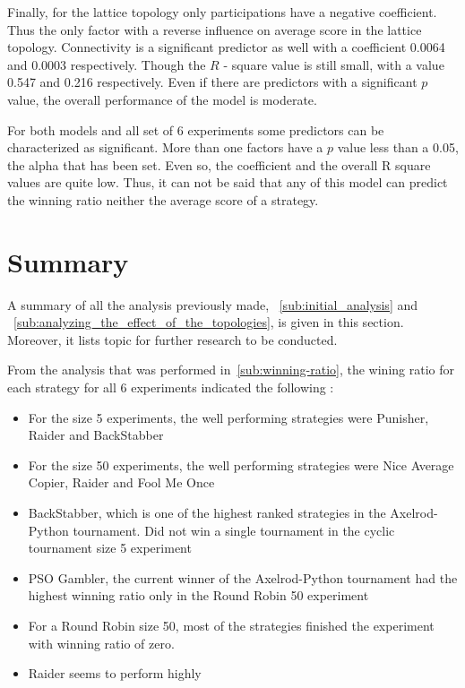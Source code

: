Finally, for the lattice topology only participations have a negative coefficient.
Thus the only factor with a reverse influence on average score in the lattice topology.
Connectivity is a significant predictor as well with a coefficient 0.0064 and
0.0003 respectively. Though the \(R\) - square value is still  small,
with a value 0.547 and 0.216 respectively.
Even if there are predictors with a significant \(p\) value, the overall
performance of the model is moderate.

For both models and all set of 6 experiments some predictors can be characterized
as significant. More than one factors have a \(p\) value less than a 0.05, the alpha
that has been set. Even so, the coefficient and the overall R square values are
quite low. Thus, it can not be said that any of this model can predict the
winning ratio neither the average score of a strategy.

\section{Summary}
\label{sub:summary}

A summary of all the analysis previously made, ~\ref{sub:initial_analysis} and
~\ref{sub:analyzing_the_effect_of_the_topologies}, is given in this section.
Moreover, it lists topic for further research to be conducted.

From the analysis that was performed in~\ref{sub:winning-ratio}, the wining ratio
for each strategy for all 6 experiments indicated the following :

\begin{itemize}
  \item For the size 5 experiments, the well performing strategies were Punisher,
        Raider and BackStabber
  \item For the size 50 experiments, the well performing strategies were Nice
        Average Copier, Raider and Fool Me Once
  \item BackStabber, which is one of the highest ranked strategies in the
        Axelrod-Python tournament. Did not win a single tournament in the cyclic
        tournament size 5 experiment
  \item PSO Gambler, the current winner of the Axelrod-Python tournament had the
        highest winning ratio only in the Round Robin 50 experiment
  \item For a Round Robin size 50, most of the strategies finished the experiment
        with winning ratio of zero.
  \item Raider seems to perform highly
\end{itemize}

